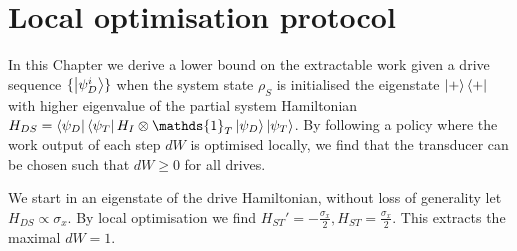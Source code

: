 \section{Local optimisation protocol}
In this Chapter we derive a lower bound on the extractable work given a drive sequence $\{\ket{\psi_D^i}\}$ when the system state $\rho_S$ is initialised the eigenstate $\ket{+}\bra{+}$ with higher eigenvalue of the partial system Hamiltonian $H_{DS} = \bra{\psi_D}\bra{\psi_T} H_I \otimes \mathds{1}_T \ket{\psi_D} \ket{\psi_T}$.
By following a policy where the work output of each step $dW$ is optimised locally, we find that the transducer can be chosen such that $dW \geq 0$ for all drives.

We start in an eigenstate of the drive Hamiltonian, without loss of generality let $H_{DS} \propto \sigma_x$.
By local optimisation we find $H_{ST}' = -\frac{\sigma_x}{2}, H_{ST} = \frac{\sigma_x}{2}$.
This extracts the maximal $dW = 1$.

